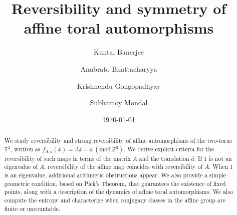 \documentclass[12pt]{amsart}
\theoremstyle{plain}
\theoremstyle{definition}
\theoremstyle{remark}
\begin{document}
	
	
	\title{Reversibility and  symmetry of affine toral automorphisms}
	
    \author[K. Banerjee]{Kuntal Banerjee}
   
    \address{Department of Mathematics, Presidency University, 86/1, College Street, Kolkata - 700073, West Bengal, India. 
	}

     \author[A. Bhattacharyya]{Anubrato Bhattacharyya} 
    \address{Department of Mathematics, Presidency University, 86/1, College Street, Kolkata - 700073, West Bengal, India. 
	}
    
\author[K. Gongopadhyay]{Krishnendu Gongopadhyay} 

\address{Indian Institute of Science Education and Research (IISER) Mohali, Knowledge City,  Sector 81, S.A.S. Nagar 140306, Punjab, India}

    \author[S. Mondal]{Subhamoy Mondal}
    \address{Department of Mathematics, The Heritage college,  West Chowbaga Rd, Anandapur, Kolkata - 700107, West Bengal, India. 
	}
	
\begin{abstract}
We study reversibility and strong reversibility of affine automorphisms of the two-torus $\mathbb T^{2}$, written as
$f_{A,\bar{a}}(\bar{x})=A\bar{x}+\bar{a} \ (\mathrm{mod}\ \mathbb{Z}^2)$.
We derive explicit criteria for the reversibility of such maps in terms of the matrix $A$ and the translation  $\bar{a}$. If $1$ is not an eigenvalue of $A$, reversibility of the affine map coincides with reversibility of $A$.
When $1$ is an eigenvalue, additional arithmetic obstructions appear.
We also provide a simple geometric condition, based on Pick's Theorem, that guarantees the existence of fixed points, along with a description of the dynamics of affine toral automorphisms. We also  compute the entropy and characterize when conjugacy classes in the affine group are finite or uncountable.

\end{abstract}


\date{\today}
	\maketitle
\end{document}
